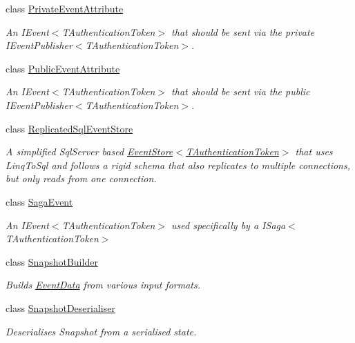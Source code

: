 \begin{DoxyCompactItemize}
class \hyperlink{classCqrs_1_1Events_1_1PrivateEventAttribute}{Private\+Event\+Attribute}
\begin{DoxyCompactList}\small\item\em An I\+Event$<$\+T\+Authentication\+Token$>$ that should be sent via the private I\+Event\+Publisher$<$\+T\+Authentication\+Token$>$. \end{DoxyCompactList}\item 
class \hyperlink{classCqrs_1_1Events_1_1PublicEventAttribute}{Public\+Event\+Attribute}
\begin{DoxyCompactList}\small\item\em An I\+Event$<$\+T\+Authentication\+Token$>$ that should be sent via the public I\+Event\+Publisher$<$\+T\+Authentication\+Token$>$. \end{DoxyCompactList}\item 
class \hyperlink{classCqrs_1_1Events_1_1ReplicatedSqlEventStore}{Replicated\+Sql\+Event\+Store}
\begin{DoxyCompactList}\small\item\em A simplified Sql\+Server based \hyperlink{classCqrs_1_1Events_1_1EventStore_a6346cb2aea4c5b4e740dc6cfb15abab8_a6346cb2aea4c5b4e740dc6cfb15abab8}{Event\+Store$<$\+T\+Authentication\+Token$>$} that uses Linq\+To\+Sql and follows a rigid schema that also replicates to multiple connections, but only reads from one connection. \end{DoxyCompactList}\item 
class \hyperlink{classCqrs_1_1Events_1_1SagaEvent}{Saga\+Event}
\begin{DoxyCompactList}\small\item\em An I\+Event$<$\+T\+Authentication\+Token$>$ used specifically by a I\+Saga$<$\+T\+Authentication\+Token$>$ \end{DoxyCompactList}\item 
class \hyperlink{classCqrs_1_1Events_1_1SnapshotBuilder}{Snapshot\+Builder}
\begin{DoxyCompactList}\small\item\em Builds \hyperlink{classCqrs_1_1Events_1_1EventData}{Event\+Data} from various input formats. \end{DoxyCompactList}\item 
class \hyperlink{classCqrs_1_1Events_1_1SnapshotDeserialiser}{Snapshot\+Deserialiser}
\begin{DoxyCompactList}\small\item\em Deserialises Snapshot from a serialised state. \end{DoxyCompactList}\item 

\end{DoxyCompactItemize}
